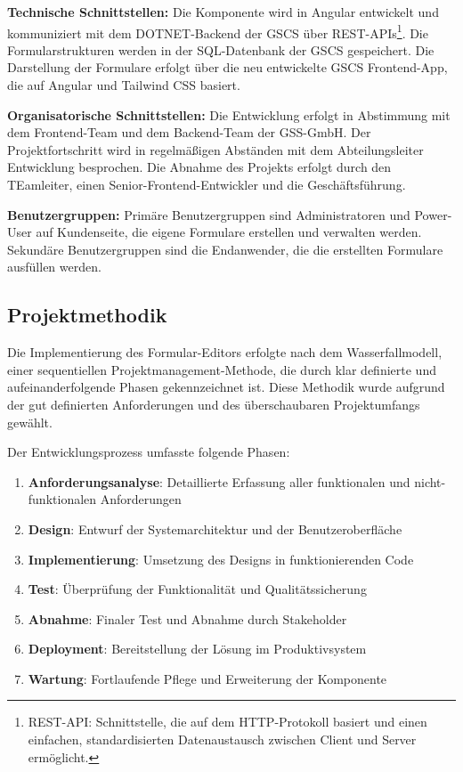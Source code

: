 \documentclass[a4paper,11pt]{article}
\begin{document}
\noindent \textbf{Technische Schnittstellen:} Die Komponente wird in Angular entwickelt und kommuniziert mit dem DOTNET-Backend der GSCS über REST-APIs\footnote{REST-API: Schnittstelle, die auf dem HTTP-Protokoll basiert und einen einfachen, standardisierten Datenaustausch zwischen Client und Server ermöglicht.}. Die Formularstrukturen werden in der SQL-Datenbank der GSCS gespeichert. Die Darstellung der Formulare erfolgt über die neu entwickelte GSCS Frontend-App, die auf Angular und Tailwind CSS basiert.


\noindent \textbf{Organisatorische Schnittstellen:} Die Entwicklung erfolgt in Abstimmung mit dem Frontend-Team und dem Backend-Team der GSS-GmbH. Der Projektfortschritt wird in regelmäßigen Abständen mit dem Abteilungsleiter Entwicklung besprochen. Die Abnahme des Projekts erfolgt durch den TEamleiter, einen Senior-Frontend-Entwickler und die Geschäftsführung.

\noindent \textbf{Benutzergruppen:} Primäre Benutzergruppen sind Administratoren und Power-User auf Kundenseite, die eigene Formulare erstellen und verwalten werden. Sekundäre Benutzergruppen sind die Endanwender, die die erstellten Formulare ausfüllen werden.

\subsection{Projektmethodik}
Die Implementierung des Formular-Editors erfolgte nach dem Wasserfallmodell, einer sequentiellen Projektmanagement-Methode, die durch klar definierte und aufeinanderfolgende Phasen gekennzeichnet ist. Diese Methodik wurde aufgrund der gut definierten Anforderungen und des überschaubaren Projektumfangs gewählt.

Der Entwicklungsprozess umfasste folgende Phasen:
\begin{enumerate}
  \item \textbf{Anforderungsanalyse}: Detaillierte Erfassung aller funktionalen und nicht-funktionalen Anforderungen
  \item \textbf{Design}: Entwurf der Systemarchitektur und der Benutzeroberfläche
  \item \textbf{Implementierung}: Umsetzung des Designs in funktionierenden Code
  \item \textbf{Test}: Überprüfung der Funktionalität und Qualitätssicherung
  \item \textbf{Abnahme}: Finaler Test und Abnahme durch Stakeholder
  \item \textbf{Deployment}: Bereitstellung der Lösung im Produktivsystem
  \item \textbf{Wartung}: Fortlaufende Pflege und Erweiterung der Komponente
\end{enumerate}
\end{document}
